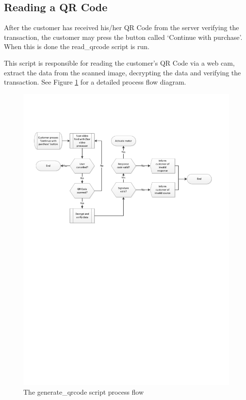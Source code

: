 \subsection{Reading a QR Code}

After the customer has received his/her QR Code from the server verifying the
transaction, the customer may press the button called `Continue with purchase'.
When this is done the read\_qrcode script is run.

This script is responsible for reading the customer's QR Code via a web cam,
extract the data from the scanned image, decrypting the data and verifying the
transaction. See Figure \ref{fig:read-qrcode-processflow} for a detailed process
flow diagram.

\begin{figure}
 \centering 
 \includegraphics[clip=true, trim
 = 0 460 0 100, scale=0.75]{read_qrcode_processflow}
 \caption{The generate\_qrcode script process flow}
 \label{fig:read-qrcode-processflow}
\end{figure}

